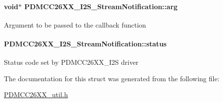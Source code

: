 \paragraph[{arg}]{\setlength{\rightskip}{0pt plus 5cm}void$\ast$ P\+D\+M\+C\+C26\+X\+X\+\_\+\+I2\+S\+\_\+\+Stream\+Notification\+::arg}\label{struct_p_d_m_c_c26_x_x___i2_s___stream_notification_a1801d35678740cfd40b4204b66b134e0}
Argument to be passed to the callback function 
\paragraph[{status}]{ P\+D\+M\+C\+C26\+X\+X\+\_\+\+I2\+S\+\_\+\+Stream\+Notification\+::status}\label{struct_p_d_m_c_c26_x_x___i2_s___stream_notification_a0299d59c398531b389196e260548ad30}
Status code set by P\+D\+M\+C\+C26\+X\+X\+\_\+\+I2\+S driver 

The documentation for this struct was generated from the following file\+:\begin{DoxyCompactItemize}
\item 
\hyperlink{_p_d_m_c_c26_x_x__util_8h}{P\+D\+M\+C\+C26\+X\+X\+\_\+util.\+h}\end{DoxyCompactItemize}
